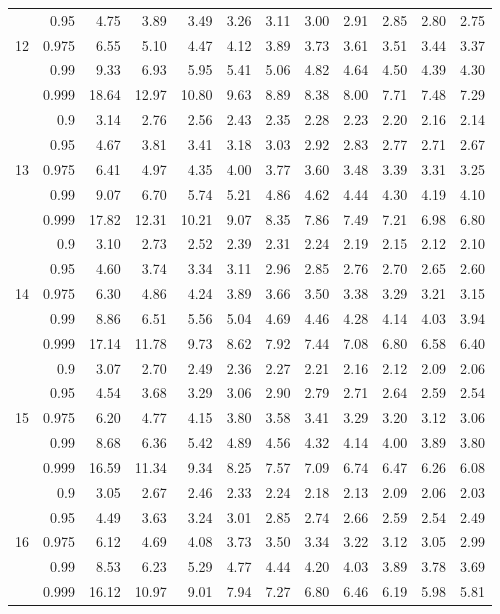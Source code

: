 \documentclass[12pt,a4paper,openany,twoside]{report}
\theoremstyle{definition}
\theoremstyle{remark}
\theoremstyle{plain}
\theoremstyle{definition}
\theoremstyle{definition}
\theoremstyle{definition}
\theoremstyle{remark}
\begin{document}
\begin{center}
\begin{tabular}{rr@{\ \ }r@{\ \ }r@{\ \ }r@{\ \ }r@{\ \ }r@{\ \ }r@{\ \ }r@{\ \ }r@{\ \ }r@{\ \ }r@{ }}
 & 0.95 & 4.75 & 3.89 & 3.49 & 3.26 & 3.11 & 3.00 & 2.91 & 2.85 & 2.80 & 2.75\\
12 & 0.975 & 6.55 & 5.10 & 4.47 & 4.12 & 3.89 & 3.73 & 3.61 & 3.51 & 3.44 & 3.37\\
 & 0.99 & 9.33 & 6.93 & 5.95 & 5.41 & 5.06 & 4.82 & 4.64 & 4.50 & 4.39 & 4.30\\
 & 0.999 & 18.64 & 12.97 & 10.80 & 9.63 & 8.89 & 8.38 & 8.00 & 7.71 & 7.48 & 7.29\\
\rule{0pt}{2.5ex} & 0.9 & 3.14 & 2.76 & 2.56 & 2.43 & 2.35 & 2.28 & 2.23 & 2.20 & 2.16 & 2.14\\
 & 0.95 & 4.67 & 3.81 & 3.41 & 3.18 & 3.03 & 2.92 & 2.83 & 2.77 & 2.71 & 2.67\\
13 & 0.975 & 6.41 & 4.97 & 4.35 & 4.00 & 3.77 & 3.60 & 3.48 & 3.39 & 3.31 & 3.25\\
 & 0.99 & 9.07 & 6.70 & 5.74 & 5.21 & 4.86 & 4.62 & 4.44 & 4.30 & 4.19 & 4.10\\
 & 0.999 & 17.82 & 12.31 & 10.21 & 9.07 & 8.35 & 7.86 & 7.49 & 7.21 & 6.98 & 6.80\\
\rule{0pt}{2.5ex} & 0.9 & 3.10 & 2.73 & 2.52 & 2.39 & 2.31 & 2.24 & 2.19 & 2.15 & 2.12 & 2.10\\
 & 0.95 & 4.60 & 3.74 & 3.34 & 3.11 & 2.96 & 2.85 & 2.76 & 2.70 & 2.65 & 2.60\\
14 & 0.975 & 6.30 & 4.86 & 4.24 & 3.89 & 3.66 & 3.50 & 3.38 & 3.29 & 3.21 & 3.15\\
 & 0.99 & 8.86 & 6.51 & 5.56 & 5.04 & 4.69 & 4.46 & 4.28 & 4.14 & 4.03 & 3.94\\
 & 0.999 & 17.14 & 11.78 & 9.73 & 8.62 & 7.92 & 7.44 & 7.08 & 6.80 & 6.58 & 6.40\\
\rule{0pt}{2.5ex} & 0.9 & 3.07 & 2.70 & 2.49 & 2.36 & 2.27 & 2.21 & 2.16 & 2.12 & 2.09 & 2.06\\
 & 0.95 & 4.54 & 3.68 & 3.29 & 3.06 & 2.90 & 2.79 & 2.71 & 2.64 & 2.59 & 2.54\\
15 & 0.975 & 6.20 & 4.77 & 4.15 & 3.80 & 3.58 & 3.41 & 3.29 & 3.20 & 3.12 & 3.06\\
 & 0.99 & 8.68 & 6.36 & 5.42 & 4.89 & 4.56 & 4.32 & 4.14 & 4.00 & 3.89 & 3.80\\
 & 0.999 & 16.59 & 11.34 & 9.34 & 8.25 & 7.57 & 7.09 & 6.74 & 6.47 & 6.26 & 6.08\\
\rule{0pt}{2.5ex} & 0.9 & 3.05 & 2.67 & 2.46 & 2.33 & 2.24 & 2.18 & 2.13 & 2.09 & 2.06 & 2.03\\
 & 0.95 & 4.49 & 3.63 & 3.24 & 3.01 & 2.85 & 2.74 & 2.66 & 2.59 & 2.54 & 2.49\\
16 & 0.975 & 6.12 & 4.69 & 4.08 & 3.73 & 3.50 & 3.34 & 3.22 & 3.12 & 3.05 & 2.99\\
 & 0.99 & 8.53 & 6.23 & 5.29 & 4.77 & 4.44 & 4.20 & 4.03 & 3.89 & 3.78 & 3.69\\
 & 0.999 & 16.12 & 10.97 & 9.01 & 7.94 & 7.27 & 6.80 & 6.46 & 6.19 & 5.98 & 5.81\\
\end{tabular}
\end{center}
\end{document}
